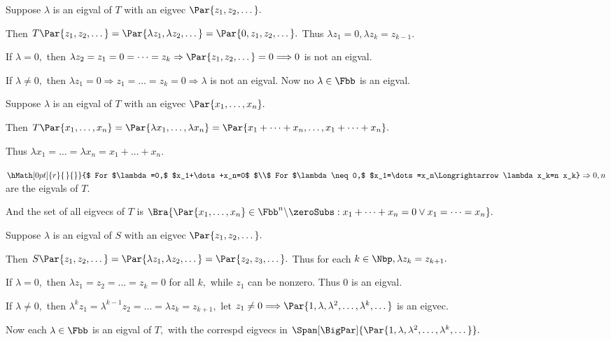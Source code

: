 Suppose $\lambda$ is an eigval of $T$ with an eigvec $\Par{z_1,z_2,\dots}.$\par
\Blind{\Solution} Then $T\Par{z_1,z_2,\dots}=\Par{\lambda z_1,\lambda z_2,\dots}=\Par{0,z_1,z_2,\dots}.$ Thus $\lambda z_1=0,\lambda z_k=z_{k-1}.$\par
\Blind{\Solution} If $\lambda=0,$ then $\lambda z_2=z_1=0=\dots=z_k\Rightarrow\Par{z_1,z_2,\dots}=0\Longrightarrow0$ is not an eigval.\par
\Blind{\Solution} If $\lambda\neq 0,$ then $\lambda z_1=0\Rightarrow z_1=\dots=z_k=0\Longrightarrow\lambda$ is not an eigval. Now no $\lambda\in\Fbb$ is an eigval.\PfEnd
\SepLine

\par\quad
Suppose $\lambda$ is an eigval of $T$ with an eigvec $\Par{x_1,\dots,x_n}.$\par\quad
Then $T\Par{x_1,\dots,x_n}=\Par{\lambda x_1,\dots,\lambda x_n}=\Par{x_1+\dots+x_n,\dots,x_1+\dots+x_n}.$\par\quad
Thus $\lambda x_1=\dots=\lambda x_n=x_1+\dots+x_n.$\par\quad
$\hMath[0pt]{r}{\left.}{\right\}}{$
	For $\lambda=0,$ $x_1+\dots+x_n=0$ $\\$
	For $\lambda\neq 0,$ $x_1=\dots=x_n\Longrightarrow\lambda x_k=n x_k}\Rightarrow0,n$ are the eigvals of $T.$\par\quad
And the set of all eigvecs of $T$ is $\Bra{\Par{x_1,\dots,x_n}\in\Fbb^n\backslash\zeroSubs:x_1+\dots+x_n=0\vee x_1=\dots=x_n}.$\PfEnd
\SepLine

\par\quad
Suppose $\lambda$ is an eigval of $S$ with an eigvec $\Par{z_1,z_2,\dots}.$\par\quad
Then $S\Par{z_1,z_2,\dots}=\Par{\lambda z_1,\lambda z_2,\dots}=\Par{z_2,z_3,\dots}.$ Thus for each $k\in\Nbp,\lambda z_k=z_{k+1}.$\par\quad
If $\lambda=0,$ then $\lambda z_1=z_2=\dots=z_k=0$ for all $k,$ while $z_1$ can be nonzero. Thus $0$ is an eigval.\par\quad
If $\lambda\neq 0,$ then $\lambda^k z_1=\lambda^{k-1} z_2=\dots=\lambda z_k=z_{k+1},$ let $z_1\neq 0\Longrightarrow\Par{1,\lambda,\lambda^2,\dots,\lambda^k,\dots}$ is an eigvec.\par\quad
Now each $\lambda\in\Fbb$ is an eigval of $T,$ with the correspd eigvecs in $\Span[\BigPar]{\Par{1,\lambda,\lambda^2,\dots,\lambda^k,\dots}}.$\PfEnd
\SepLine\pagebreak

